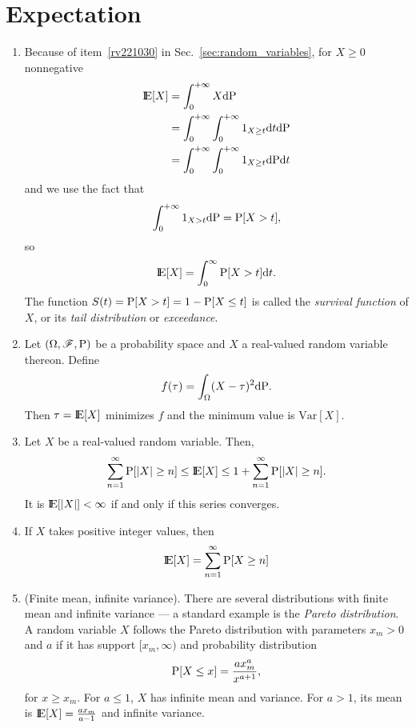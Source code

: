 \documentclass[a4paper,10pt]{article}
\begin{document}
\section{Expectation}
\begin{enumerate}  

\item 
 \label{gx1312}
 Because of item~\ref{rv221030} in Sec.~\ref{sec:random_variables}, for $X\geq 0$ nonnegative 
 \begin{align*}
  \E[X] &= \int_{0}^{+\infty} X \d \prob\\
        &= \int_{0}^{+\infty} \int_0^{+\infty} 1_{X\geq t}\d t \d \prob\\
        &= \int_{0}^{+\infty} \int_0^{+\infty} 1_{X\geq t} \d \prob \d t
 \end{align*}
 and we use the fact that 
 \[
  \int_{0}^{+\infty} 1_{X>t}\mathrm{d} \mathrm{P} = \mathrm{P}[X>t],
 \]
 so
 \[
  \E[X] = \int_0^\infty \prob[X>t]\d t.
 \]
 The function $S(t) = \mathrm{P}[X>t] = 1-\mathrm{P}[X\leq t]$ is called the \textit{survival function} 
 of $X$, or its \textit{tail distribution} or \textit{exceedance}.

 \item Let $(\Omega,\mathscr{F},\mathrm{P})$ be a probability space and $X$ a real-valued random variable thereon. Define 
 \[
  f(\tau) = \int_{\Omega}(X-\tau)^2\mathrm{d}\mathrm{P}.
 \]
 Then $\tau = \E[X]$ minimizes $f$ and the minimum value is $\mathrm{Var}[X]$.
 \item Let $X$ be a real-valued random variable. Then,
 \[
  \sum_{n=1}^{\infty}\prob[|X|\geq n] \leq \E[X] \leq 1+ \sum_{n=1}^{\infty}\prob[|X|\geq n].
 \]
 It is $\E[|X|]<\infty$ if and only if this series converges.
 \item If $X$ takes positive integer values, then
 \[
  \E[X] = \sum_{n=1}^{\infty}\prob[X\geq n]
 \]

 \item (Finite mean, infinite variance). There are several distributions with finite mean 
       and infinite variance --- a standard example is the \textit{Pareto distribution}.
       A random variable $X$ follows the Pareto distribution with parameters $x_m>0$ and $a$
       if it has support $[x_m,\infty)$ and probability distribution
       \[
        \mathrm{P}[X\leq x] = \frac{ax_m^a}{x^{a+1}},
       \]
       for $x\geq x_m$. For $a\leq 1$, $X$ has infinite mean and variance. For $a>1$, its
       mean is $\E[X]=\frac{ax_m}{a-1}$ and infinite variance.

\end{enumerate}
\end{document}
